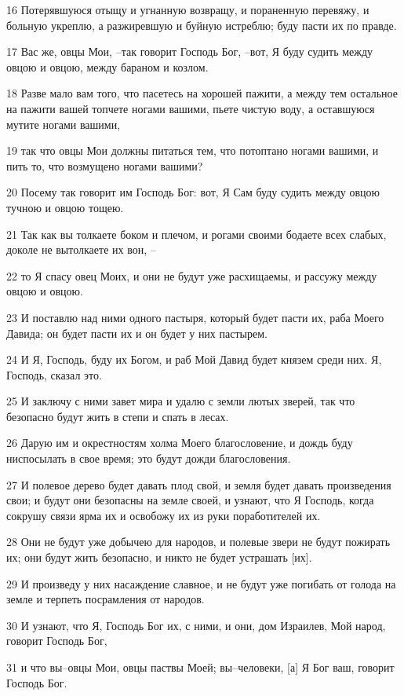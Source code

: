 \par 16 Потерявшуюся отыщу и угнанную возвращу, и пораненную перевяжу, и больную укреплю, а разжиревшую и буйную истреблю; буду пасти их по правде.
\par 17 Вас же, овцы Мои, --так говорит Господь Бог, --вот, Я буду судить между овцою и овцою, между бараном и козлом.
\par 18 Разве мало вам того, что пасетесь на хорошей пажити, а между тем остальное на пажити вашей топчете ногами вашими, пьете чистую воду, а оставшуюся мутите ногами вашими,
\par 19 так что овцы Мои должны питаться тем, что потоптано ногами вашими, и пить то, что возмущено ногами вашими?
\par 20 Посему так говорит им Господь Бог: вот, Я Сам буду судить между овцою тучною и овцою тощею.
\par 21 Так как вы толкаете боком и плечом, и рогами своими бодаете всех слабых, доколе не вытолкаете их вон, --
\par 22 то Я спасу овец Моих, и они не будут уже расхищаемы, и рассужу между овцою и овцою.
\par 23 И поставлю над ними одного пастыря, который будет пасти их, раба Моего Давида; он будет пасти их и он будет у них пастырем.
\par 24 И Я, Господь, буду их Богом, и раб Мой Давид будет князем среди них. Я, Господь, сказал это.
\par 25 И заключу с ними завет мира и удалю с земли лютых зверей, так что безопасно будут жить в степи и спать в лесах.
\par 26 Дарую им и окрестностям холма Моего благословение, и дождь буду ниспосылать в свое время; это будут дожди благословения.
\par 27 И полевое дерево будет давать плод свой, и земля будет давать произведения свои; и будут они безопасны на земле своей, и узнают, что Я Господь, когда сокрушу связи ярма их и освобожу их из руки поработителей их.
\par 28 Они не будут уже добычею для народов, и полевые звери не будут пожирать их; они будут жить безопасно, и никто не будет устрашать [их].
\par 29 И произведу у них насаждение славное, и не будут уже погибать от голода на земле и терпеть посрамления от народов.
\par 30 И узнают, что Я, Господь Бог их, с ними, и они, дом Израилев, Мой народ, говорит Господь Бог,
\par 31 и что вы--овцы Мои, овцы паствы Моей; вы--человеки, [а] Я Бог ваш, говорит Господь Бог.

